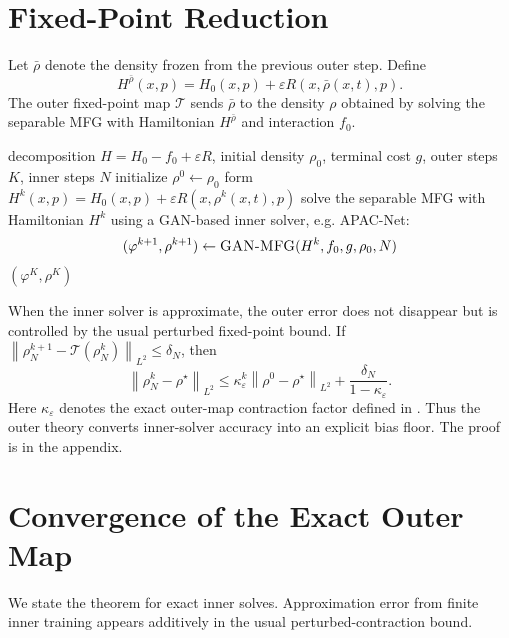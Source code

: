 \documentclass{article}
\newcommand{\eps}{\varepsilon}
\newcommand{\norm}[1]{\left\lVert #1 \right\rVert}
\begin{document}
\section{Fixed-Point Reduction}

Let \(\bar\rho\) denote the density frozen from the previous outer step.  Define
\[
  H^{\bar\rho}(x,p)=H_0(x,p)+\eps R(x,\bar\rho(x,t),p).
\]
The outer fixed-point map \(\mathcal{T}\) sends \(\bar\rho\) to the density
\(\rho\) obtained by solving the separable MFG with Hamiltonian
\(H^{\bar\rho}\) and interaction \(f_0\).

\begin{algorithm}[t]
\caption{Fixed-point wrapper for GAN-compatible MFG solvers}
\label{alg:neurips}
\begin{algorithmic}[1]
\Require decomposition \(H=H_0-f_0+\eps R\), initial density \(\rho_0\),
terminal cost \(g\), outer steps \(K\), inner steps \(N\)
\State initialize \(\rho^0\gets \rho_0\)
  \State form \(H^k(x,p)=H_0(x,p)+\eps R(x,\rho^k(x,t),p)\)
  \State solve the separable MFG with Hamiltonian \(H^k\) using a GAN-based
  inner solver, e.g. APAC-Net:
  \[
    (\varphi^{k+1},\rho^{k+1})\gets \textsc{GAN-MFG}(H^k,f_0,g,\rho_0,N)
  \]
\EndFor
\State \Return \((\varphi^K,\rho^K)\)
\end{algorithmic}
\end{algorithm}

When the inner solver is approximate, the outer error does not disappear but is
controlled by the usual perturbed fixed-point bound.  If
\(\norm{\rho_N^{k+1}-\mathcal{T}(\rho_N^k)}_{L^2}\leq\delta_N\), then
\[
  \norm{\rho_N^k-\rho^\star}_{L^2}
  \leq \kappa_\eps^k\norm{\rho^0-\rho^\star}_{L^2}
  +\frac{\delta_N}{1-\kappa_\eps}.
\]
Here \(\kappa_\eps\) denotes the exact outer-map contraction factor defined in
.
Thus the outer theory converts inner-solver accuracy into an explicit bias
floor.  The proof is in the appendix.

\section{Convergence of the Exact Outer Map}

We state the theorem for exact inner solves.  Approximation error from finite
inner training appears additively in the usual perturbed-contraction bound.
\end{document}
